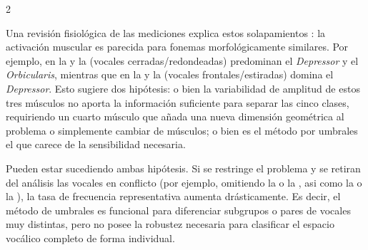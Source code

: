 \documentclass[11pt, letterpaper]{article}
\begin{document}
\begin{multicols*}{2}


Una revisión fisiológica de las mediciones explica estos solapamientos \cite{ipa1999}: la activación muscular es parecida para fonemas morfológicamente similares. Por ejemplo, en la  y la  (vocales cerradas/redondeadas) predominan el \textit{Depressor} y el \textit{Orbicularis}, mientras que en la  y la  (vocales frontales/estiradas) domina el \textit{Depressor}. Esto sugiere dos hipótesis: o bien la variabilidad de amplitud de estos tres músculos no aporta la información suficiente para separar las cinco clases, requiriendo un cuarto músculo que añada una nueva dimensión geométrica al problema o simplemente cambiar de músculos; o bien es el método por umbrales el que carece de la sensibilidad necesaria.

Pueden estar sucediendo ambas hipótesis. Si se restringe el problema y se retiran del análisis las vocales en conflicto (por ejemplo, omitiendo la  o la , asi como la  o la ), la tasa de frecuencia representativa aumenta drásticamente. Es decir, el método de umbrales es funcional para diferenciar subgrupos o pares de vocales muy distintas, pero no posee la robustez necesaria para clasificar el espacio vocálico completo de forma individual.


\end{multicols*}
\end{document}
